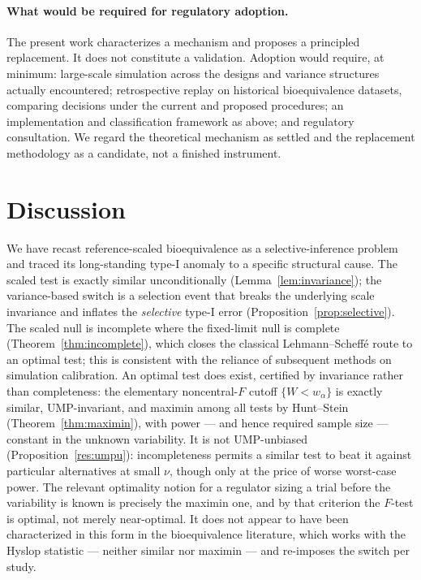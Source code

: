 \documentclass[11pt]{article}
\theoremstyle{remark}
\begin{document}
\paragraph{What would be required for regulatory adoption.} The present work characterizes a mechanism and proposes a principled replacement. It does not constitute a validation. Adoption would require, at minimum: large-scale simulation across the designs and variance structures actually encountered; retrospective replay on historical bioequivalence datasets, comparing decisions under the current and proposed procedures; an implementation and classification framework as above; and regulatory consultation. We regard the theoretical mechanism as settled and the replacement methodology as a candidate, not a finished instrument.

\section{Discussion}\label{sec:discussion}

We have recast reference-scaled bioequivalence as a selective-inference problem and traced its long-standing type-I anomaly to a specific structural cause. The scaled test is exactly similar unconditionally (Lemma~\ref{lem:invariance}); the variance-based switch is a selection event that breaks the underlying scale invariance and inflates the \emph{selective} type-I error (Proposition~\ref{prop:selective}). The scaled null is incomplete where the fixed-limit null is complete (Theorem~\ref{thm:incomplete}), which closes the classical Lehmann--Scheff\'e route to an optimal test; this is consistent with the reliance of subsequent methods on simulation calibration. An optimal test does exist, certified by invariance rather than completeness: the elementary noncentral-$F$ cutoff $\{W<w_\alpha\}$ is exactly similar, UMP-invariant, and maximin among all tests by Hunt--Stein (Theorem~\ref{thm:maximin}), with power --- and hence required sample size --- constant in the unknown variability. It is not UMP-unbiased (Proposition~\ref{res:umpu}): incompleteness permits a similar test to beat it against particular alternatives at small $\nu$, though only at the price of worse worst-case power. The relevant optimality notion for a regulator sizing a trial before the variability is known is precisely the maximin one, and by that criterion the $F$-test is optimal, not merely near-optimal. It does not appear to have been characterized in this form in the bioequivalence literature, which works with the Hyslop statistic --- neither similar nor maximin --- and re-imposes the switch per study.
\end{document}
